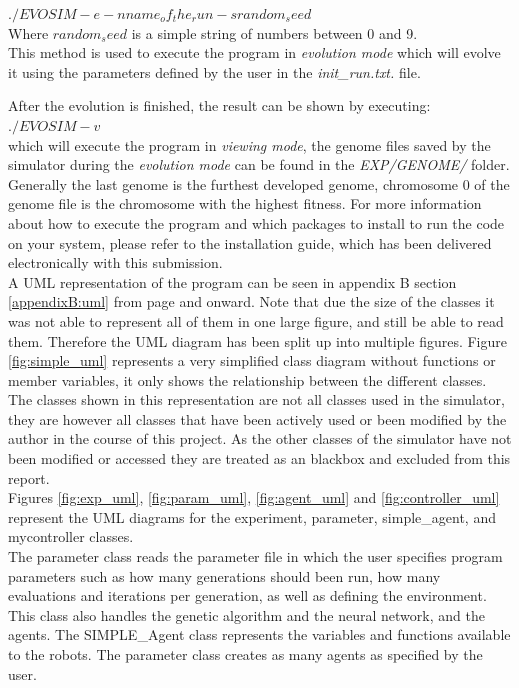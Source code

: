 $./EVOSIM -e -n name_of_the_run -s random_seed$ \\

Where $random_seed$ is a simple string of numbers between 0 and 9. \\
This method is used to execute the program in \textit{evolution mode} which will evolve it using the parameters defined by the user in the \textit{init\_run.txt.} file.

After the evolution is finished, the result can be shown by executing:\\

$./EVOSIM -v$\\

which will execute the program in \textit{viewing mode}, the genome files saved by the simulator during the \textit{evolution mode} can be found in the \textit{EXP/GENOME/} folder. Generally the last genome is the furthest developed genome, chromosome 0 of the genome file is the chromosome with the highest fitness. For more information about how to execute the program and which packages to install to run the code on your system, please refer to the installation guide, which has been delivered electronically with this submission.\\

A UML representation of the program can be seen in appendix B section \ref{appendixB:uml} from page \pageref{appendixB:uml} and onward. 
Note that due the size of the classes it was not able to represent all of them in one large figure, and still be able to read them.
Therefore the UML diagram has been split up into multiple figures. 
Figure \ref{fig:simple_uml} represents a very simplified class diagram without functions or member variables, it only shows the relationship between the different classes.
The classes shown in this representation are not all classes used in the simulator, they are however all classes that have been actively used or been modified by the author in the course of this project.
As the other classes of the simulator have not been modified or accessed they are treated as an blackbox and excluded from this report.\\
Figures \ref{fig:exp_uml}, \ref{fig:param_uml}, \ref{fig:agent_uml} and \ref{fig:controller_uml} represent the UML diagrams for the experiment, parameter, simple\_agent, and mycontroller classes.\\

The parameter class reads the parameter file in which the user specifies program parameters such as how many generations should been run, how many evaluations and iterations per generation, as well as defining the environment.
This class also handles the genetic algorithm and the neural network, and the agents.
The SIMPLE\_Agent class represents the variables and functions available to the robots. The parameter class creates as many agents as specified by the user.\\

